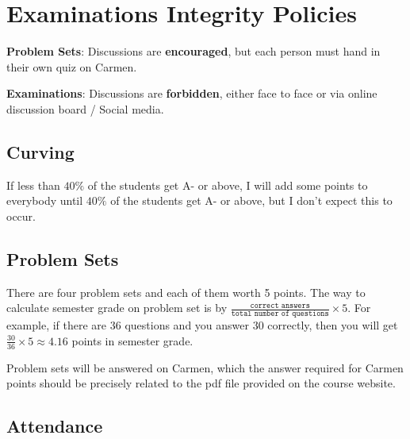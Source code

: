 \documentclass[12pt]{article}
\begin{document}
\section*{Examinations Integrity Policies}

\textbf{Problem Sets}: Discussions are \textbf{encouraged}, but each person must hand in their own quiz on Carmen.

\textbf{Examinations}: Discussions are \textbf{forbidden}, either face to face or via online discussion board / Social media.



\subsection*{Curving}

If less than $40\%$ of the students get A- or above, I will add some points to everybody until $40\%$ of the students get A- or above, but I don’t expect this to occur.

\subsection*{Problem Sets}
\label{sub:Problem_Sets}

There are four problem sets and each of them worth 5 points.
The way to calculate semester grade on problem set is by $ \frac{ \texttt{correct answers} }{ \texttt{total number of questions} } \times 5 $.
For example, if there are 36 questions and you answer 30 correctly, then you will get $ \frac{30}{36} \times 5 \approx 4.16$ points in semester grade.


Problem sets will be answered on Carmen, which the answer required for Carmen points should be precisely related to the pdf file provided on the course website.

\subsection*{Attendance}
\label{sub:Attendance}
\end{document}
